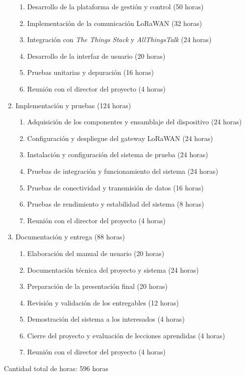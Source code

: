 \documentclass[
11pt, %
]{charter}
\begin{document}
\begin{enumerate}
\begin{enumerate}
	\item Desarrollo de la plataforma de gestión y control (50 horas)
	\item Implementación de la comunicación LoRaWAN (32 horas)
	\item Integración con \emph{The Things Stack} y \emph{AllThingsTalk} (24 horas)
	\item Desarrollo de la interfaz de usuario (20 horas)
	\item Pruebas unitarias y depuración (16 horas)
	\item Reunión con el director del proyecto (4 horas)
	\end{enumerate}
\item Implementación y pruebas (124 horas)
	\begin{enumerate}
	\item Adquisición de los componentes y ensamblaje del dispositivo (24 horas)
	\item Configuración y despliegue del gateway LoRaWAN (24 horas)
	\item Instalación y configuración del sistema de prueba (24 horas)
	\item Pruebas de integración y funcionamiento del sistema (24 horas)
	\item Pruebas de conectividad y transmisión de datos (16 horas)
	\item Pruebas de rendimiento y estabilidad del sistema (8 horas)
	\item Reunión con el director del proyecto (4 horas)
	\end{enumerate}
\item Documentación y entrega (88 horas)
	\begin{enumerate}
	\item Elaboración del manual de usuario (20 horas)
	\item Documentación técnica del proyecto y sistema (24 horas)
	\item Preparación de la presentación final (20 horas)
	\item Revisión y validación de los entregables (12 horas)
	\item Demostración del sistema a los interesados (4 horas)
	\item Cierre del proyecto y evaluación de lecciones aprendidas (4 horas)
	\item Reunión con el director del proyecto (4 horas)
	\end{enumerate}
\end{enumerate}

Cantidad total de horas: 596 horas
\end{document}
